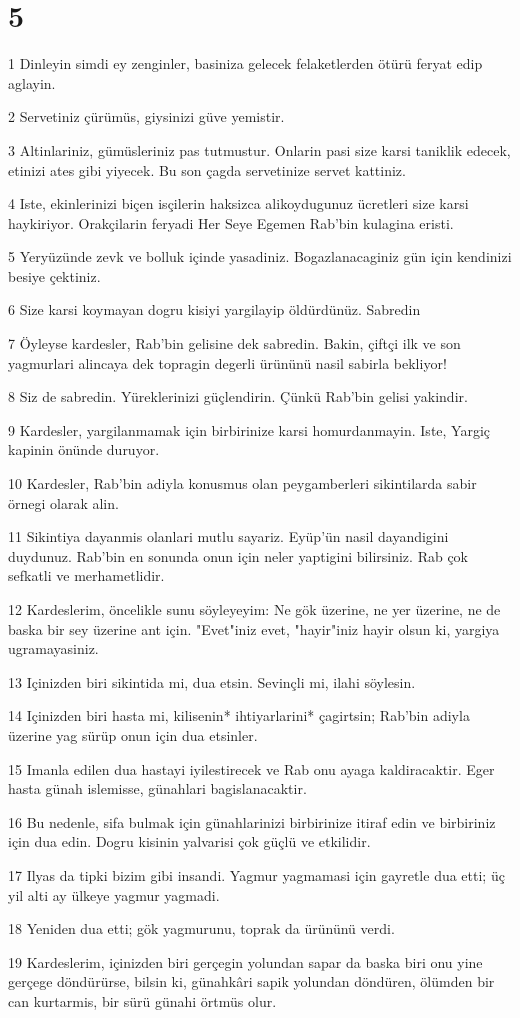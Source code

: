 \chapter{5}

\par 1 Dinleyin simdi ey zenginler, basiniza gelecek felaketlerden ötürü feryat edip aglayin.
\par 2 Servetiniz çürümüs, giysinizi güve yemistir.
\par 3 Altinlariniz, gümüsleriniz pas tutmustur. Onlarin pasi size karsi taniklik edecek, etinizi ates gibi yiyecek. Bu son çagda servetinize servet kattiniz.
\par 4 Iste, ekinlerinizi biçen isçilerin haksizca alikoydugunuz ücretleri size karsi haykiriyor. Orakçilarin feryadi Her Seye Egemen Rab'bin kulagina eristi.
\par 5 Yeryüzünde zevk ve bolluk içinde yasadiniz. Bogazlanacaginiz gün için kendinizi besiye çektiniz.
\par 6 Size karsi koymayan dogru kisiyi yargilayip öldürdünüz. Sabredin
\par 7 Öyleyse kardesler, Rab'bin gelisine dek sabredin. Bakin, çiftçi ilk ve son yagmurlari alincaya dek topragin degerli ürününü nasil sabirla bekliyor!
\par 8 Siz de sabredin. Yüreklerinizi güçlendirin. Çünkü Rab'bin gelisi yakindir.
\par 9 Kardesler, yargilanmamak için birbirinize karsi homurdanmayin. Iste, Yargiç kapinin önünde duruyor.
\par 10 Kardesler, Rab'bin adiyla konusmus olan peygamberleri sikintilarda sabir örnegi olarak alin.
\par 11 Sikintiya dayanmis olanlari mutlu sayariz. Eyüp'ün nasil dayandigini duydunuz. Rab'bin en sonunda onun için neler yaptigini bilirsiniz. Rab çok sefkatli ve merhametlidir.
\par 12 Kardeslerim, öncelikle sunu söyleyeyim: Ne gök üzerine, ne yer üzerine, ne de baska bir sey üzerine ant için. "Evet"iniz evet, "hayir"iniz hayir olsun ki, yargiya ugramayasiniz.
\par 13 Içinizden biri sikintida mi, dua etsin. Sevinçli mi, ilahi söylesin.
\par 14 Içinizden biri hasta mi, kilisenin* ihtiyarlarini* çagirtsin; Rab'bin adiyla üzerine yag sürüp onun için dua etsinler.
\par 15 Imanla edilen dua hastayi iyilestirecek ve Rab onu ayaga kaldiracaktir. Eger hasta günah islemisse, günahlari bagislanacaktir.
\par 16 Bu nedenle, sifa bulmak için günahlarinizi birbirinize itiraf edin ve birbiriniz için dua edin. Dogru kisinin yalvarisi çok güçlü ve etkilidir.
\par 17 Ilyas da tipki bizim gibi insandi. Yagmur yagmamasi için gayretle dua etti; üç yil alti ay ülkeye yagmur yagmadi.
\par 18 Yeniden dua etti; gök yagmurunu, toprak da ürününü verdi.
\par 19 Kardeslerim, içinizden biri gerçegin yolundan sapar da baska biri onu yine gerçege döndürürse, bilsin ki, günahkâri sapik yolundan döndüren, ölümden bir can kurtarmis, bir sürü günahi örtmüs olur.


